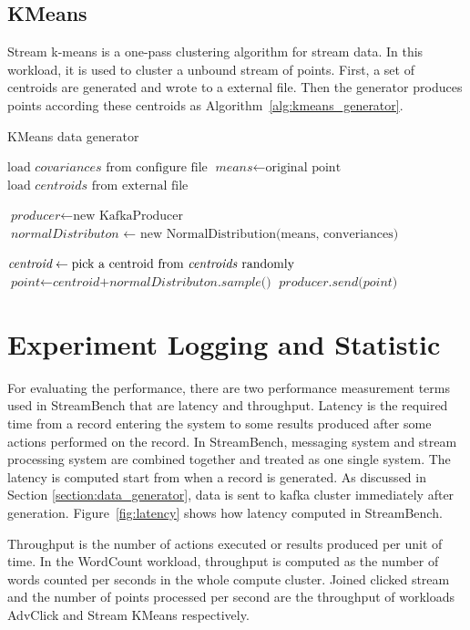 \subsection{KMeans}

Stream k-means is a one-pass clustering algorithm for stream data. In this workload, it is used to cluster a unbound stream of points. First, a set of centroids are generated and wrote to a external file. Then the generator produces points according these centroids as Algorithm~\ref{alg:kmeans_generator}.

\begin{algorithm}
\caption{KMeans data generator}\label{euclid}
\label{alg:kmeans_generator}
\begin{algorithmic}[1]
\State $\text{load } \textit{covariances} \text{ from configure file}$
\State $\textit{means} \gets \text{original point}$
\State $\text{load } \textit{centroids} \text{ from external file}$

\State $\textit{producer} \gets \text{new KafkaProducer}$ 
\State $\textit{normalDistributon } \gets \text{ new NormalDistribution(means, converiances)}$

\State $\textit{centroid} \gets \text{pick a centroid from \textit{centroids} randomly}$ 
\State $\textit{point} \gets \textit{centroid+normalDistributon.sample()}$ 
\State $\textit{producer.send(point)}$ 

\EndWhile
\end{algorithmic}
\end{algorithm}


\section{Experiment Logging and Statistic}
\label{section:log_statistic}

For evaluating the performance, there are two performance measurement terms used in StreamBench that are latency and throughput. Latency is the required time from a record entering the system to some results produced after some actions performed on the record. In StreamBench, messaging system and stream processing system are combined together and treated as one single system. The latency is computed start from when a record is generated. As discussed in Section \ref{section:data_generator}, data is sent to kafka cluster immediately after generation. Figure~\ref{fig:latency} shows how latency computed in StreamBench. 

Throughput is the number of actions executed or results produced per unit of time. In the WordCount workload, throughput is computed as the number of words counted per seconds in the whole compute cluster. Joined clicked stream and the number of points processed per second are the throughput of workloads AdvClick and Stream KMeans respectively.

